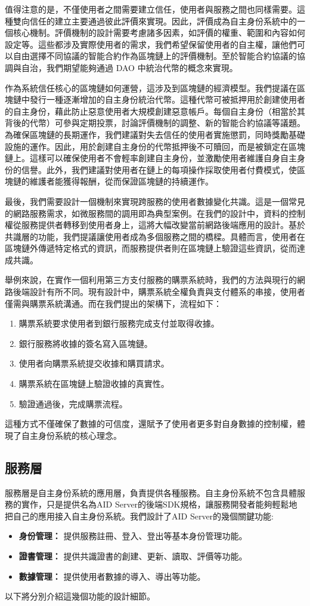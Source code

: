 值得注意的是，不僅使用者之間需要建立信任，使用者與服務之間也同樣需要。這種雙向信任的建立主要通過彼此評價來實現。因此，評價成為自主身份系統中的一個核心機制。評價機制的設計需要考慮諸多因素，如評價的權重、範圍和內容如何設定等。這些都涉及實際使用者的需求，我們希望保留使用者的自主權，讓他們可以自由選擇不同協議的智能合約作為區塊鏈上的評價機制。至於智能合約協議的協調與自治，我們期望能夠通過 DAO 中統治代幣的概念來實現。

作為系統信任核心的區塊鏈如何運營，這涉及到區塊鏈的經濟模型。我們提議在區塊鏈中發行一種逐漸增加的自主身份統治代幣。這種代幣可被抵押用於創建使用者的自主身份，藉此防止惡意使用者大規模創建惡意帳戶。每個自主身份（相當於其背後的代幣）可參與定期投票，討論評價機制的調整、新的智能合約協議等議題。為確保區塊鏈的長期運作，我們建議對失去信任的使用者實施懲罰，同時獎勵基礎設施的運作。因此，用於創建自主身份的代幣抵押後不可贖回，而是被鎖定在區塊鏈上。這樣可以確保使用者不會輕率創建自主身份，並激勵使用者維護自身自主身份的信譽。此外，我們建議對使用者在鏈上的每項操作採取使用者付費模式，使區塊鏈的維護者能獲得報酬，從而保證區塊鏈的持續運作。

最後，我們需要設計一個機制來實現跨服務的使用者數據變化共識。這是一個常見的網路服務需求，如微服務間的調用即為典型案例。在我們的設計中，資料的控制權從服務提供者轉移到使用者身上，這將大幅改變當前網路後端應用的設計。基於共識層的功能，我們提議讓使用者成為多個服務之間的橋樑。具體而言，使用者在區塊鏈外傳遞特定格式的資訊，而服務提供者則在區塊鏈上驗證這些資訊，從而達成共識。

舉例來說，在實作一個利用第三方支付服務的購票系統時，我們的方法與現行的網路後端設計有所不同。現有設計中，購票系統全權負責與支付體系的串接，使用者僅需與購票系統溝通。而在我們提出的架構下，流程如下：
\begin{enumerate}
  \item 購票系統要求使用者到銀行服務完成支付並取得收據。
  \item 銀行服務將收據的簽名寫入區塊鏈。
  \item 使用者向購票系統提交收據和購買請求。
  \item 購票系統在區塊鏈上驗證收據的真實性。
  \item 驗證通過後，完成購票流程。
\end{enumerate}
這種方式不僅確保了數據的可信度，還賦予了使用者更多對自身數據的控制權，體現了自主身份系統的核心理念。
\subsection{服務層}
服務層是自主身份系統的應用層，負責提供各種服務。自主身份系統不包含具體服務的實作，只是提供名為AID Server的後端SDK規格，讓服務開發者能夠輕鬆地把自己的應用接入自主身份系統。我們設計了AID Server的幾個關鍵功能:
\begin{itemize}
  \item \textbf{身份管理：} 提供服務註冊、登入、登出等基本身份管理功能。
  \item \textbf{證書管理：} 提供共識證書的創建、更新、讀取、評價等功能。
  \item \textbf{數據管理：} 提供使用者數據的導入、導出等功能。
\end{itemize}
以下將分別介紹這幾個功能的設計細節。
